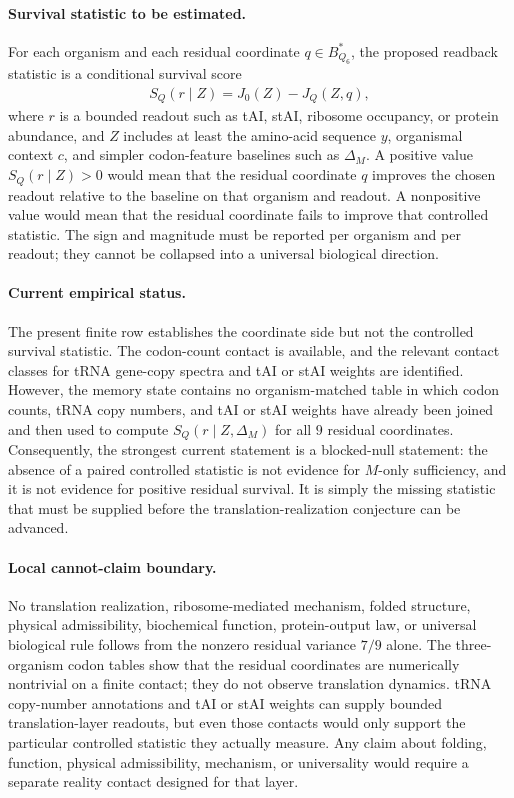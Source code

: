 \paragraph{Survival statistic to be estimated.}
For each organism and each residual coordinate $q\in B^*_{Q_6}$, the proposed readback statistic is a conditional survival score
$$
\begin{aligned}
S_Q(r\mid Z)=J_0(Z)-J_Q(Z,q),
\end{aligned}
$$
where $r$ is a bounded readout such as tAI, stAI, ribosome occupancy, or protein abundance, and $Z$ includes at least the amino-acid sequence $y$, organismal context $c$, and simpler codon-feature baselines such as $\Delta_M$.  A positive value $S_Q(r\mid Z)>0$ would mean that the residual coordinate $q$ improves the chosen readout relative to the baseline on that organism and readout.  A nonpositive value would mean that the residual coordinate fails to improve that controlled statistic.  The sign and magnitude must be reported per organism and per readout; they cannot be collapsed into a universal biological direction.

\paragraph{Current empirical status.}
The present finite row establishes the coordinate side but not the controlled survival statistic.  The codon-count contact is available, and the relevant contact classes for tRNA gene-copy spectra and tAI or stAI weights are identified.  However, the memory state contains no organism-matched table in which codon counts, tRNA copy numbers, and tAI or stAI weights have already been joined and then used to compute $S_Q(r\mid Z,\Delta_M)$ for all $9$ residual coordinates.  Consequently, the strongest current statement is a blocked-null statement: the absence of a paired controlled statistic is not evidence for $M$-only sufficiency, and it is not evidence for positive residual survival.  It is simply the missing statistic that must be supplied before the translation-realization conjecture can be advanced.

\paragraph{Local cannot-claim boundary.}
No translation realization, ribosome-mediated mechanism, folded structure, physical admissibility, biochemical function, protein-output law, or universal biological rule follows from the nonzero residual variance $7/9$ alone.  The three-organism codon tables show that the residual coordinates are numerically nontrivial on a finite contact; they do not observe translation dynamics.  tRNA copy-number annotations and tAI or stAI weights can supply bounded translation-layer readouts, but even those contacts would only support the particular controlled statistic they actually measure.  Any claim about folding, function, physical admissibility, mechanism, or universality would require a separate reality contact designed for that layer.

